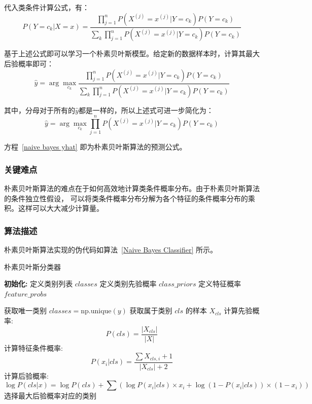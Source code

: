 \documentclass[12pt]{article}
\begin{document}
代入类条件计算公式，有：
\begin{equation}
  P(Y = c_k | X = x) = \frac{\prod_{j=1}^{n} P(X^{(j)} = x^{(j)} | Y = c_k) P(Y = c_k)}{\sum_{k} \prod_{j=1}^{n} P(X^{(j)} = x^{(j)} | Y = c_k) P(Y = c_k)}
\end{equation}

基于上述公式即可以学习一个朴素贝叶斯模型。给定新的数据样本时，计算其最大后验概率即可：
\begin{equation}
  \hat{y} = \arg \max_{c_k} \frac{\prod_{j=1}^{n} P(X^{(j)} = x^{(j)} | Y = c_k) P(Y = c_k)}{\sum_{k} \prod_{j=1}^{n} P(X^{(j)} = x^{(j)} | Y = c_k) P(Y = c_k)}
\end{equation}

其中，分母对于所有的$\hat{y}$都是一样的，所以上述式可进一步简化为：
\begin{equation}
  \hat{y} = \arg \max_{c_k} \prod_{j=1}^{n} P(X^{(j)} = x^{(j)} | Y = c_k) P(Y = c_k)  \label{naive bayes yhat}
\end{equation}

方程~\ref{naive bayes yhat} 即为朴素贝叶斯算法的预测公式。

\subsubsection{关键难点}
朴素贝叶斯算法的难点在于如何高效地计算类条件概率分布。由于朴素贝叶斯算法的条件独立性假设，
可以将类条件概率分布分解为各个特征的条件概率分布的乘积。这样可以大大减少计算量。

\subsubsection{算法描述}
朴素贝叶斯算法实现的伪代码如算法~\ref{Naive Bayes Classifier} 所示。
\begin{algorithm}[H]
  \caption{朴素贝叶斯分类器}
  \label{Naive Bayes Classifier}
  \begin{algorithmic}[1]
    \State \textbf{初始化:}
    \State 定义类别列表 $classes$
    \State 定义类别先验概率 $class\_priors$
    \State 定义特征概率 $feature\_probs$

    \State 获取唯一类别 $classes = \text{np.unique}(y)$
    \State 获取属于类别 $cls$ 的样本 $X_{cls}$
    \State 计算先验概率:
    \[P(cls) = \frac{|X_{cls}|}{|X|}\]
    \State 计算特征条件概率:
    \[P(x_i | cls) = \frac{\sum X_{cls,i} + 1}{|X_{cls}| + 2}\]
    \EndFor
    \EndProcedure
    \State 计算后验概率:
    \[\log P(cls | x) = \log P(cls) + \sum (\log P(x_i | cls) \times x_i + \log (1 - P(x_i | cls)) \times (1 - x_i))\]
    \EndFor
    \State 选择最大后验概率对应的类别
    \EndFor
    \EndProcedure
  \end{algorithmic}
\end{algorithm}
\end{document}

